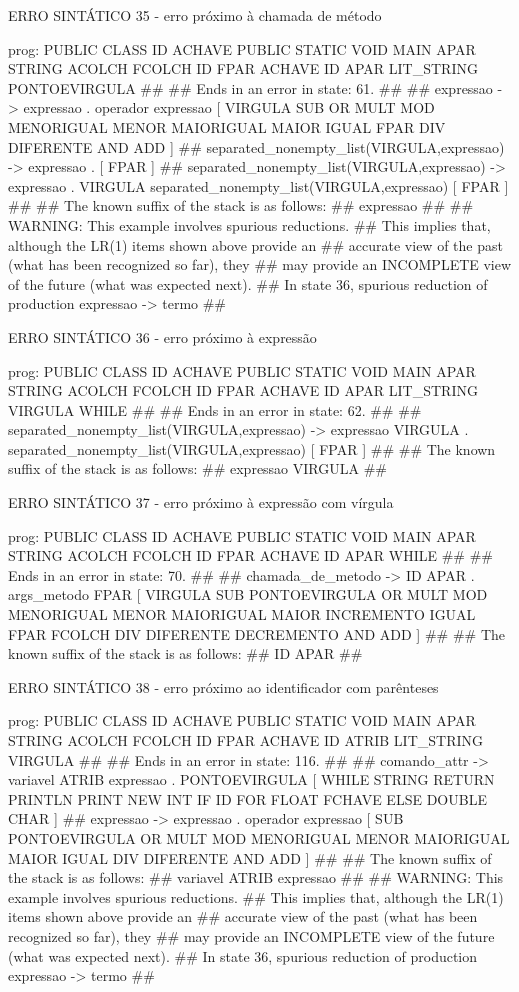 \documentclass[12pt,a4paper,twoside]{report}
\begin{document}
\begin{terminal}
ERRO SINTÁTICO 35 -  erro próximo à chamada de método

prog: PUBLIC CLASS ID ACHAVE PUBLIC STATIC VOID MAIN APAR STRING ACOLCH FCOLCH ID FPAR ACHAVE ID APAR LIT_STRING PONTOEVIRGULA 
##
## Ends in an error in state: 61.
##
## expressao -> expressao . operador expressao [ VIRGULA SUB OR MULT MOD MENORIGUAL MENOR MAIORIGUAL MAIOR IGUAL FPAR DIV DIFERENTE AND ADD ]
## separated_nonempty_list(VIRGULA,expressao) -> expressao . [ FPAR ]
## separated_nonempty_list(VIRGULA,expressao) -> expressao . VIRGULA separated_nonempty_list(VIRGULA,expressao) [ FPAR ]
##
## The known suffix of the stack is as follows:
## expressao 
##
## WARNING: This example involves spurious reductions.
## This implies that, although the LR(1) items shown above provide an
## accurate view of the past (what has been recognized so far), they
## may provide an INCOMPLETE view of the future (what was expected next).
## In state 36, spurious reduction of production expressao -> termo 
##

ERRO SINTÁTICO 36 - erro próximo à expressão

prog: PUBLIC CLASS ID ACHAVE PUBLIC STATIC VOID MAIN APAR STRING ACOLCH FCOLCH ID FPAR ACHAVE ID APAR LIT_STRING VIRGULA WHILE 
##
## Ends in an error in state: 62.
##
## separated_nonempty_list(VIRGULA,expressao) -> expressao VIRGULA . separated_nonempty_list(VIRGULA,expressao) [ FPAR ]
##
## The known suffix of the stack is as follows:
## expressao VIRGULA 
##

ERRO SINTÁTICO 37 -  erro próximo à expressão com vírgula

prog: PUBLIC CLASS ID ACHAVE PUBLIC STATIC VOID MAIN APAR STRING ACOLCH FCOLCH ID FPAR ACHAVE ID APAR WHILE 
##
## Ends in an error in state: 70.
##
## chamada_de_metodo -> ID APAR . args_metodo FPAR [ VIRGULA SUB PONTOEVIRGULA OR MULT MOD MENORIGUAL MENOR MAIORIGUAL MAIOR INCREMENTO IGUAL FPAR FCOLCH DIV DIFERENTE DECREMENTO AND ADD ]
##
## The known suffix of the stack is as follows:
## ID APAR 
##

ERRO SINTÁTICO 38 -  erro próximo ao identificador com parênteses

prog: PUBLIC CLASS ID ACHAVE PUBLIC STATIC VOID MAIN APAR STRING ACOLCH FCOLCH ID FPAR ACHAVE ID ATRIB LIT_STRING VIRGULA 
##
## Ends in an error in state: 116.
##
## comando_attr -> variavel ATRIB expressao . PONTOEVIRGULA [ WHILE STRING RETURN PRINTLN PRINT NEW INT IF ID FOR FLOAT FCHAVE ELSE DOUBLE CHAR ]
## expressao -> expressao . operador expressao [ SUB PONTOEVIRGULA OR MULT MOD MENORIGUAL MENOR MAIORIGUAL MAIOR IGUAL DIV DIFERENTE AND ADD ]
##
## The known suffix of the stack is as follows:
## variavel ATRIB expressao 
##
## WARNING: This example involves spurious reductions.
## This implies that, although the LR(1) items shown above provide an
## accurate view of the past (what has been recognized so far), they
## may provide an INCOMPLETE view of the future (what was expected next).
## In state 36, spurious reduction of production expressao -> termo 
##


\end{terminal}
\end{document}
